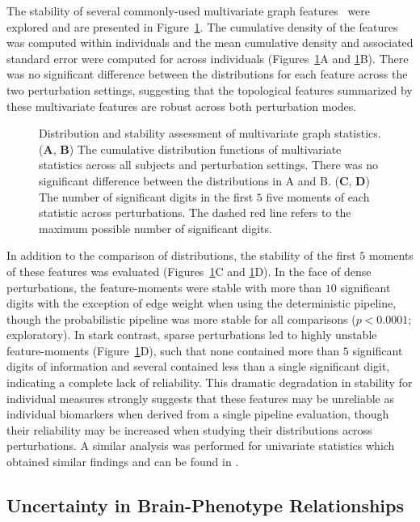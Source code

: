 \documentclass[10pt,letterpaper]{article}
\begin{document}
The stability of several commonly-used multivariate graph features~\cite{Betzel2018-eo}
were explored and are presented in Figure~\ref{fig:multivar}. The cumulative density of
the features was computed within individuals and the mean cumulative density and
associated standard error were computed for across individuals
(Figures~\ref{fig:multivar}A and \ref{fig:multivar}B). There was no significant
difference between the distributions for each feature across the two perturbation
settings, suggesting that the topological features summarized by these multivariate
features are robust across both perturbation modes.

\begin{figure}[bht!]\centering
\caption{Distribution and stability assessment of multivariate graph statistics.
(\textbf{A}, \textbf{B}) The cumulative distribution functions of multivariate
statistics across all subjects and perturbation settings. There was no significant
difference between the distributions in A and B. (\textbf{C}, \textbf{D}) The number
of significant digits in the first $5$ five moments of each statistic across
perturbations. The dashed red line refers to the maximum possible number of
significant digits.}
\label{fig:multivar}
\end{figure}

In addition to the comparison of distributions, the stability of the first $5$ moments 
of these features was evaluated (Figures~\ref{fig:multivar}C and \ref{fig:multivar}D). 
In the face of dense perturbations, the feature-moments were stable with more than
$10$ significant digits with the exception of edge weight when using the deterministic
pipeline, though the probabilistic pipeline was more stable for all comparisons
($p < 0.0001$; exploratory). In stark contrast, sparse perturbations led to highly
unstable feature-moments (Figure~\ref{fig:multivar}D), such that none contained more
than $5$ significant digits of information and several contained less than a single
significant digit, indicating a complete lack of reliability. This dramatic degradation
in stability for individual measures strongly suggests that these features may be
unreliable as individual biomarkers when derived from a single pipeline evaluation,
though their reliability may be increased when studying their distributions across
perturbations. A similar analysis was performed for univariate statistics which
obtained similar findings and can be found in .

\subsection*{Uncertainty in Brain-Phenotype Relationships}
\end{document}
